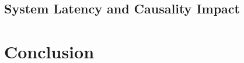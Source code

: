 \documentclass[lettersize,journal]{IEEEtran}
\begin{document}
\subsection{System Latency and Causality Impact}


\section{Conclusion}



















\end{document}

